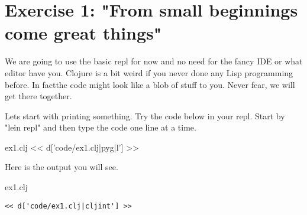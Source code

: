 \chapter{Exercise 1: "From small beginnings come great things"}

We are going to use the basic repl for now and no need for the fancy IDE or what editor have you. Clojure is a bit weird if you never done any Lisp programming before. In factthe code might look like a blob of stuff to you. Never fear, we will get there together.

Lets start with printing something. Try the code below in your repl. Start by "lein repl" and then type the code one line at a time.

\begin{code}{ex1.clj}
<< d['code/ex1.clj|pyg|l'] >>
\end{code}

Here is the output you will see.

\begin{code}{ex1.clj}
\begin{Verbatim}
<< d['code/ex1.clj|cljint'] >>
\end{Verbatim}
\end{code}
